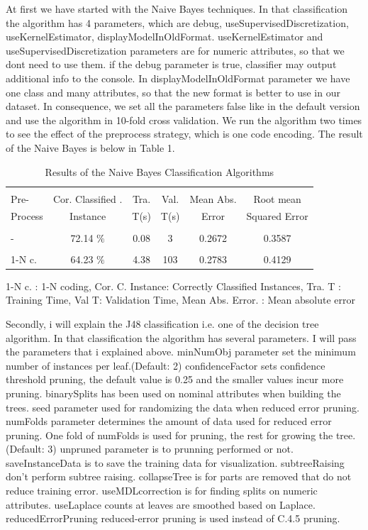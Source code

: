 \documentclass[a4paper]{article}
\begin{document}
At first we have started with the Naive Bayes techniques. In that
classification the algorithm has 4 parameters, which are debug,
useSupervisedDiscretization, useKernelEstimator, displayModelInOldFormat.
useKernelEstimator and useSupervisedDiscretization parameters are for numeric
attributes, so that we dont need to use them. if the debug parameter is true,
classifier may output additional info to the console. In
displayModelInOldFormat parameter we have one class and many attributes, so
that the new format is better to use in our dataset. In consequence, we set all
the parameters false like in the default version and use the algorithm in
10-fold cross validation. We run the algorithm two times to see the effect of
the preprocess strategy, which is one code encoding. The result of the Naive
Bayes is below in Table 1.

\begin{table}
\begin{tabular}{|l| c | c | c |c |c |}

\hline & & & & & \\
Pre- & Cor. Classified . & Tra. & Val. & Mean Abs.  & Root mean \\
Process & Instance & T(s) &  T(s) & Error & Squared Error \\
\hline & & & & & \\
- &72.14  $\%$ & 0.08 & 3 &  0.2672 & 0.3587 \\ 
\hline & & & & & \\
1-N c. &64.23  $\%$ & 4.38 & 103 & 0.2783 & 0.4129 \\ 
\hline
\end{tabular}
\caption{Results of the Naive Bayes Classification Algorithms}
	1-N c. : 1-N coding,
	Cor. C. Instance:  Correctly Classified Instances,
	Tra. T : Training Time,
	Val T: Validation Time,
	Mean Abs. Error. : Mean absolute error 
\end{table}

Secondly, i will explain the J48 classification i.e. one of the decision tree
algorithm. In that classification the algorithm has several parameters. I will
pass the parameters that i explained above. minNumObj parameter set the minimum
number of instances per leaf.(Default: 2) confidenceFactor sets confidence
threshold pruning, the default value is 0.25 and the smaller values incur more
pruning. binarySplits has been used on nominal attributes when building the
trees. seed parameter used for randomizing the data when reduced error pruning.
numFolds parameter determines the amount of data used for reduced error
pruning.  One fold of numFolds is used for pruning, the rest for growing the
tree. (Default: 3) unpruned parameter is to prunning performed or not.
saveInstanceData is to save the training data for visualization. subtreeRaising
don't perform subtree raising. collapseTree is for parts are removed that do
not reduce training error. useMDLcorrection is for finding splits on numeric
attributes. useLaplace counts at leaves are smoothed based on Laplace.
reducedErrorPruning reduced-error pruning is used instead of C.4.5 pruning. 
\end{document}
